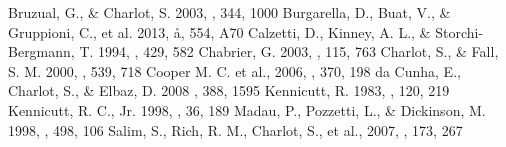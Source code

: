 \documentclass[iop]{emulateapj}
\begin{document}
\newpage



\begin{thebibliography}{}

 Bruzual, G., \& Charlot, S. 2003, \mnras, 344, 1000
 Burgarella, D., Buat, V., \& Gruppioni, C., et al. 2013, \aa, 554, A70
Calzetti, D., Kinney, A. L., \& Storchi-Bergmann, T. 1994, \apj, 429, 582
 Chabrier, G. 2003, \pasp, 115, 763
Charlot, S., \& Fall, S. M. 2000, \apj, 539, 718
 Cooper M. C. et al., 2006, \mnras, 370, 198
 da Cunha, E., Charlot, S., \& Elbaz, D. 2008 \mnras, 388, 1595
Kennicutt, R. 1983, \textcolor{red}{\aj}, 120, 219
 Kennicutt, R. C., Jr. 1998, \araa, 36, 189
 Madau, P., Pozzetti, L., \& Dickinson, M. 1998, \apj, 498, 106
 Salim, S., Rich, R. M., Charlot, S., et al., 2007, \apjs, 173, 267
\end{thebibliography}
\end{document}
